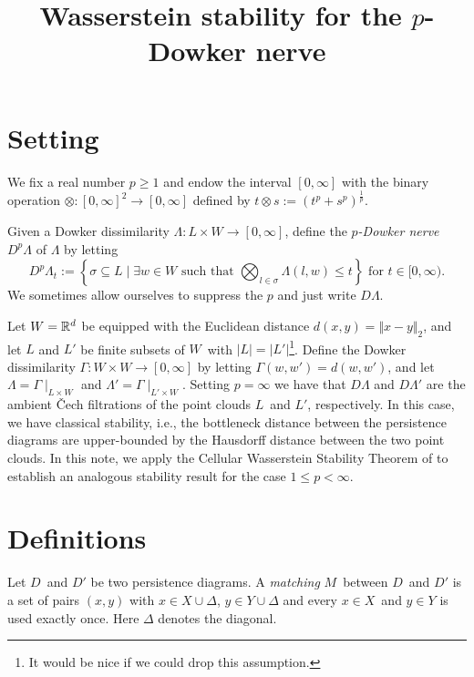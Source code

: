 
\title{Wasserstein stability for the $p$-Dowker nerve}


	\maketitle
	\section{Setting}	
	We fix a real number $p\geq 1$ and endow the interval $[0,\infty]$ with the binary operation $\otimes\colon [0,\infty]^2\to [0,\infty]$ defined by $t\otimes s := (t^p + s^p)^{\frac{1}{p}}$.

	\begin{defn}
 		Given a Dowker dissimilarity $\Lambda\colon L\times W\to[0,\infty]$, define the \textit{$p$-Dowker nerve} $D^p\Lambda$ of $\Lambda$ by letting
			$$
				D^p\Lambda_t := \left\{\sigma\subseteq L\mid \exists w\in W\text{ such that }\bigotimes_{l\in\sigma}\Lambda(l,w)\leq t\right\}\text{ for }t\in[0,\infty).
			$$
		We sometimes allow ourselves to suppress the $p$ and just write $D\Lambda$.
	\end{defn}

	Let $W=\mathbb{R}^d$ be equipped with the Euclidean distance $d(x,y)=\Vert x-y\Vert_2$, and let $L$ and $L'$ be finite subsets of $W$ with $|L|=|L'|$\footnote{It would be nice if we could drop this assumption.}. Define the Dowker dissimilarity $\Gamma\colon W\times W\to [0,\infty]$ by letting $\Gamma(w,w')=d(w,w')$, and let $\Lambda=\Gamma\mid_{L\times W}$ and $\Lambda'=\Gamma\mid_{L'\times W}$. Setting $p=\infty$ we have that $D\Lambda$ and $D\Lambda'$ are the ambient Čech filtrations of the point clouds $L$ and $L'$, respectively. In this case, we have classical stability, i.e., the bottleneck distance between the persistence diagrams are upper-bounded by the Hausdorff distance between the two point clouds. In this note, we apply the Cellular Wasserstein Stability Theorem of \autocite{skraba2022wasserstein} to establish an analogous stability result for the case $1\leq p<\infty$.
	
	\section{Definitions}
	
	Let $D$ and $D'$ be two persistence diagrams. A \textit{matching} $M$ between $D$ and $D'$ is a set of pairs $(x,y)$ with $x\in X\cup\Delta$, $y\in Y\cup\Delta$ and every $x\in X$ and $y\in Y$ is used exactly once. Here $\Delta$ denotes the diagonal.
	

